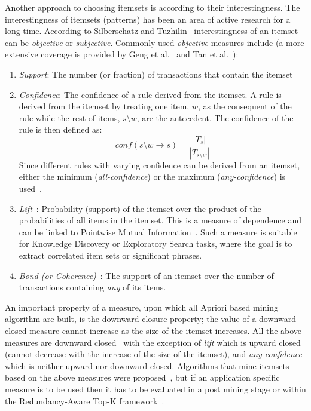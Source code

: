 \documentclass[letterpaper,12pt,titlepage,oneside,final]{book}
\begin{document}
Another approach to choosing itemsets is according to their interestingness.
The interestingness of itemsets (patterns) has been an area of active research for a long time. 
According to Silberschatz and Tuzhilin~\cite{silberschatz1996makes} interestingness of an itemset
can be \emph{objective} or \emph{subjective}.
Commonly used \emph{objective} measures include (a more extensive coverage is provided by
Geng et al.~\cite{geng2006interestingness}
and Tan et al.~\cite{tan2002selecting}):
\begin{enumerate}
\item \emph{Support}: The number (or fraction) of transactions that contain the itemset
\item \emph{Confidence}: The confidence of a rule derived from the itemset. 
A rule is derived from the itemset by treating one item, $w$, as the consequent of the rule 
while the rest of items, $s \setminus w$, are the antecedent. 
The confidence of the rule is then defined as: 
\begin{equation}conf(s \setminus w \rightarrow s) = \frac{|T_s|}{|T_{s \setminus w}|} \end{equation}
Since different rules with varying confidence can be derived from an itemset, either the minimum (\emph{all-confidence}) or the maximum (\emph{any-confidence}) is used~\cite{omiecinski2003alternative}.
\item \emph{Lift}~\cite{brin1997beyond}: Probability (support) of the itemset over the product of the probabilities of all items in the itemset. This is a measure of dependence and can be linked to Pointwise Mutual Information~\cite{bouma2009normalized}. Such a measure is suitable for Knowledge Discovery or Exploratory Search tasks, where the goal is to extract correlated item sets or significant phrases.
\item \emph{Bond (or Coherence)}~\cite{omiecinski2003alternative}: The support of an itemset over the number of transactions containing \emph{any} of its items.
\end{enumerate}

An important property of a measure, upon which all Apriori based mining algorithm are built, is the downward closure property; 
the value of a downward closed measure cannot increase as the size of the itemset increases.
 All the above measures are downward closed~\cite{bayardo1999mining} with the exception of \emph{lift} which is upward closed 
(cannot decrease with the increase of the size of the itemset), 
and \emph{any-confidence} which is neither upward nor downward closed.
Algorithms that mine itemsets based on the above measures were proposed~\cite{lee2003comine,kim2004ccmine},
but if an application specific measure is to be used then it has to be evaluated in a post mining stage 
or within the Redundancy-Aware Top-K framework~\cite{xin2006extracting}.
\end{document}
